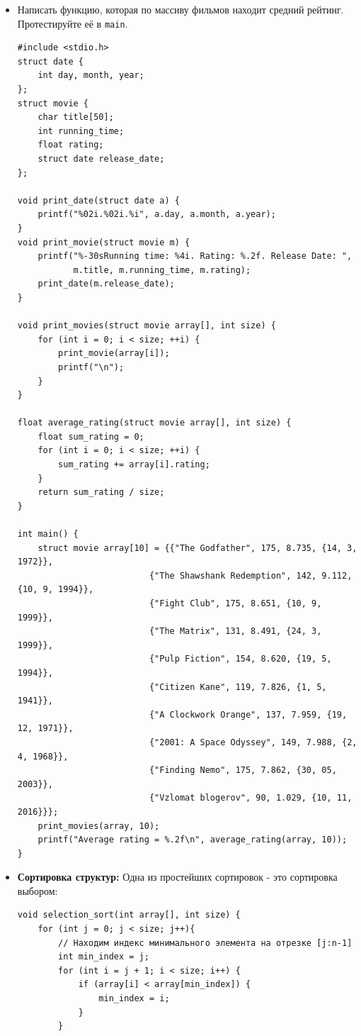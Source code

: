 \documentclass{article}
\begin{document}
\begin{itemize}
\newpage
\item Написать функцию, которая по массиву фильмов находит средний рейтинг. Протестируйте её в \texttt{main}.
\begin{lstlisting}[backgroundcolor = \color{solcolor}]
#include <stdio.h>
struct date {
    int day, month, year;
};
struct movie {
    char title[50];
    int running_time;
    float rating;
    struct date release_date;
};

void print_date(struct date a) {
    printf("%02i.%02i.%i", a.day, a.month, a.year);
}
void print_movie(struct movie m) {
    printf("%-30sRunning time: %4i. Rating: %.2f. Release Date: ", 
           m.title, m.running_time, m.rating);
    print_date(m.release_date);
}

void print_movies(struct movie array[], int size) {
    for (int i = 0; i < size; ++i) {
        print_movie(array[i]);
        printf("\n");
    }
}

float average_rating(struct movie array[], int size) {
    float sum_rating = 0;
    for (int i = 0; i < size; ++i) {
        sum_rating += array[i].rating;
    }
    return sum_rating / size;
}

int main() {
    struct movie array[10] = {{"The Godfather", 175, 8.735, {14, 3, 1972}},
                          {"The Shawshank Redemption", 142, 9.112, {10, 9, 1994}},
                          {"Fight Club", 175, 8.651, {10, 9, 1999}},
                          {"The Matrix", 131, 8.491, {24, 3, 1999}},
                          {"Pulp Fiction", 154, 8.620, {19, 5, 1994}},
                          {"Citizen Kane", 119, 7.826, {1, 5, 1941}},
                          {"A Clockwork Orange", 137, 7.959, {19, 12, 1971}},
                          {"2001: A Space Odyssey", 149, 7.988, {2, 4, 1968}},
                          {"Finding Nemo", 175, 7.862, {30, 05, 2003}},
                          {"Vzlomat blogerov", 90, 1.029, {10, 11, 2016}}};
    print_movies(array, 10);
    printf("Average rating = %.2f\n", average_rating(array, 10));
}
\end{lstlisting}

\newpage
\item \textbf{Сортировка структур:} Одна из простейших сортировок - это сортировка выбором:
\begin{lstlisting}
void selection_sort(int array[], int size) {
    for (int j = 0; j < size; j++){
        // Находим индекс минимального элемента на отрезке [j:n-1]
        int min_index = j;
        for (int i = j + 1; i < size; i++) {
            if (array[i] < array[min_index]) {
                min_index = i;
            }
        }
		

\end{lstlisting}
\end{itemize}
\end{document}
